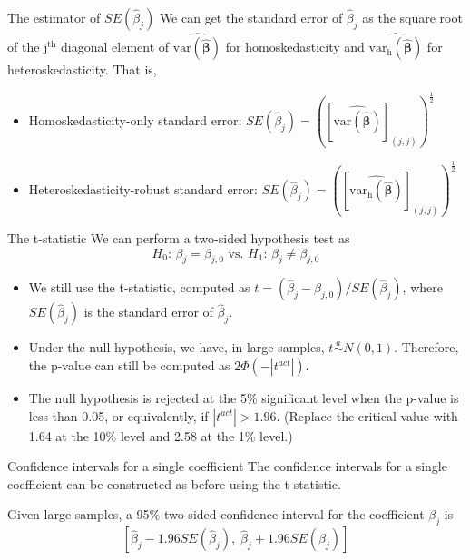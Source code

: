 \documentclass[presentation,10pt]{beamer}
\newcommand{\var}{\mathrm{var}}
\begin{document}
\begin{frame}[label={sec:orgefc12eb}]{The estimator of \(SE(\hat{\beta}_j)\)}
We can get the standard error of \(\hat{\beta}_j\) as the
square root of the j\(^{\text{th}}\) diagonal element of
\(\widehat{\var(\hat{\boldsymbol{\beta}})}\) for homoskedasticity and
\(\widehat{\var_{\mathrm{h}}(\hat{\boldsymbol{\beta}})}\) for
heteroskedasticity. That is,
\begin{itemize}
\item Homoskedasticity-only standard error: \(SE(\hat{\beta}_j) =
  \left(\left[\widehat{\var(\hat{\boldsymbol{\beta}})}\right]_{(j,j)}\right)^{\frac{1}{2}}\)
\item Heteroskedasticity-robust standard error: \(SE(\hat{\beta}_j) =
  \left(\left[\widehat{\var_{\mathrm{h}}(\hat{\boldsymbol{\beta}})}\right]_{(j,j)}\right)^{\frac{1}{2}}\)
\end{itemize}
\end{frame}

\begin{frame}[label={sec:org3561aab}]{The t-statistic}
We can perform a two-sided hypothesis test as
\[ H_0:\, \beta_j = \beta_{j,0} \text{ vs. } H_1:\, \beta_j \neq
\beta_{j,0} \]

\begin{itemize}
\item We still use the t-statistic, computed as
\(t = (\hat{\beta}_j - \beta_{j,0})/SE(\hat{\beta}_j)\),
where \(SE(\hat{\beta}_j)\) is the standard error of \(\hat{\beta}_j\).

\item Under the null hypothesis, we have, in large samples, \(t \overset{a}{\sim} N(0, 1)\).
Therefore, the p-value can still be computed as \(2\varPhi(-|t^{act}|)\).

\item The null hypothesis is rejected at the 5\% significant level when
the p-value is less than 0.05, or equivalently, if \(|t^{act}| >
  1.96\). (Replace the critical value with 1.64 at the 10\% level and 2.58
at the 1\% level.)
\end{itemize}
\end{frame}

\begin{frame}[label={sec:orge4d8504}]{Confidence intervals for a single coefficient}
The confidence intervals for a single coefficient can be constructed
as before using the t-statistic.

\vspace{0.2cm}

Given large samples, a 95\% two-sided confidence interval for the
coefficient \(\beta_j\) is
\[ \left[\hat{\beta}_j - 1.96 SE(\hat{\beta}_j),\; \hat{\beta}_j +
1.96 SE(\hat{\beta}_j)\right] \]
\end{frame}
\end{document}
